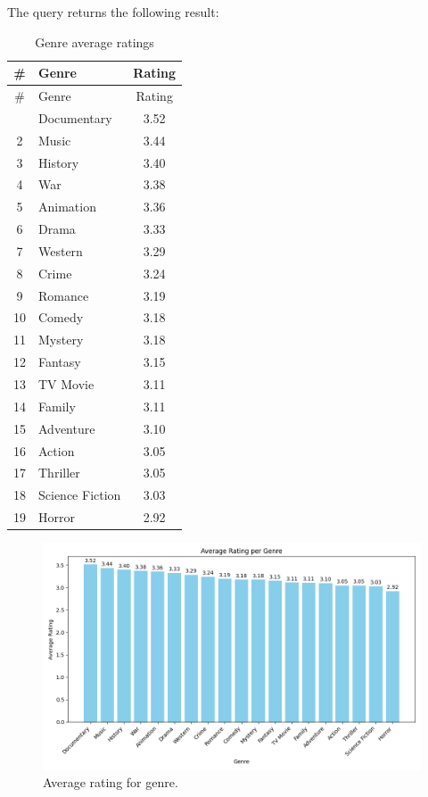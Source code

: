 \documentclass{Configuration_Files/PoliMi3i_thesis}
\begin{document}
The query returns the following result:

\begin{longtable}[!h]{|c|l|c|}
\caption{Genre average ratings} \\
\hline
\# & Genre & Rating \\
\hline
\endfirsthead
\hline
\# & Genre & Rating \\
\hline
\endhead
\hline
\endfoot
\hline
\endlastfoot
1 & Documentary       & 3.52 \\
2 & Music             & 3.44 \\
3 & History           & 3.40 \\
4 & War               & 3.38 \\
5 & Animation         & 3.36 \\
6 & Drama             & 3.33 \\
7 & Western           & 3.29 \\
8 & Crime             & 3.24 \\
9 & Romance           & 3.19 \\
10 & Comedy            & 3.18 \\
11 & Mystery           & 3.18 \\
12 & Fantasy           & 3.15 \\
13 & TV Movie          & 3.11 \\
14 & Family            & 3.11 \\
15 & Adventure         & 3.10 \\
16 & Action            & 3.05 \\
17 & Thriller          & 3.05 \\
18 & Science Fiction   & 3.03 \\
19 & Horror            & 2.92 \\
\end{longtable}

\begin{figure}[!h]
  \centering
  \includegraphics[width=\textwidth]{latex/letterboxd/visualization/average_rating_genre.png}
  \caption{Average rating for genre.}
  \label{fig:average_rating_genre}
\end{figure}
\end{document}
